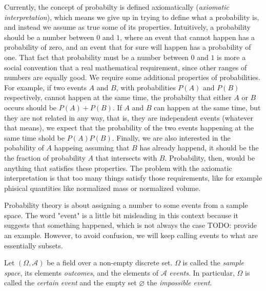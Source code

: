 Currently, the concept of probabilty is defined axiomatically (\emph{axiomatic interpretation}), which means we give up in trying to define what a probability is, and instead we assume as true some of its properties. Intuitively, a probability should be a number between $0$ and $1$, where an event that cannot happen has a probability of zero, and an event that for sure will happen has a probability of one. That fact that probability must be a number between $0$ and $1$ is more a social convention that a real mathematical requirement, since other ranges of numbers are equally good. We require some additional properties of probabilities. For example, if two events $A$ and $B$, with probabilities $P \left( A \right)$ and $P \left( B \right)$ respectively, cannot happen at the same time, the probabilty that either $A$ or $B$ occurs should be $P \left( A \right) + P \left( B \right)$. If $A$ and $B$ can happen at the same time, but they are not related in any way, that is, they are independent events (whatever that means), we expect that the probability of the two events happening at the same time shold be $P \left( A \right) P \left( B \right)$. Finally, we are also interested in the pobability of $A$ happeing assuming that $B$ has already happend, it should be the the fraction of probability $A$ that intersects with $B$. Probability, then, would be anything that satisfies these properties. The problem with the axiomatic interpretation is that too many things satisfy those requirements, like for example phisical quantities like normalized mass or normalized volume.

Probability theory is about assigning a number to some events from a sample space. The word "event" is a little bit misleading in this context because it suggests that something happened, which is not always the case {\color{red} TODO: provide an example}. However, to avoid confusion, we will keep calling events to what are essentially subsets.

\begin{definition}
Let $\left( \Omega, \mathcal{A} \right)$ be a field over a non-empty discrete set. $\Omega$ is called the \emph{sample space}, its elements \emph{outcomes}, and the elements of $\mathcal{A}$ \emph{events}. In particular, $\Omega$ is called the \emph{certain event} and the empty set $\varnothing$ the \emph{impossible event}.
\end{definition}

